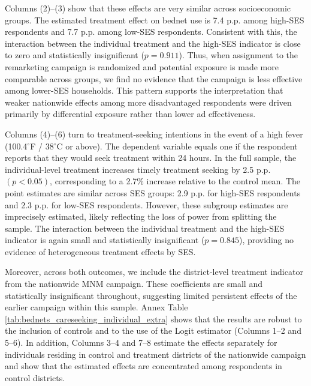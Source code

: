 \begin{table}[h!]
    \centering
    \caption{Sleeping under bednet and timely treatment seeking (individual-level study)}
    \footnotesize
    \hspace*{-0.3cm}
    
    \label{tab:bednets_careseeking_individual}
\end{table}



Columns (2)--(3) show that these effects are very similar across socioeconomic groups. The estimated treatment effect on bednet use is 7.4 p.p. among high-SES respondents and 7.7 p.p. among low-SES respondents. Consistent with this, the interaction between the individual treatment and the high-SES indicator is close to zero and statistically insignificant ($p = 0.911$). Thus, when assignment to the remarketing campaign is randomized and potential exposure is made more comparable across groups, we find no evidence that the campaign is less effective among lower-SES households. This pattern supports the interpretation that weaker nationwide effects among more disadvantaged respondents were driven primarily by differential exposure rather than lower ad effectiveness.

Columns (4)--(6) turn to treatment-seeking intentions in the event of a high fever (100.4$^\circ$F / 38$^\circ$C or above). The dependent variable equals one if the respondent reports that they would seek treatment within 24 hours. In the full sample, the individual-level treatment increases timely treatment seeking by 2.5 p.p. $(p<0.05)$, corresponding to a 2.7\% increase relative to the control mean. The point estimates are similar across SES groups: 2.9 p.p. for high-SES respondents and 2.3 p.p. for low-SES respondents. However, these subgroup estimates are imprecisely estimated, likely reflecting the loss of power from splitting the sample. The interaction between the individual treatment and the high-SES indicator is again small and statistically insignificant ($p = 0.845$), providing no evidence of heterogeneous treatment effects by SES.

Moreover, across both outcomes, we include the district-level treatment indicator from the nationwide MNM campaign. These coefficients are small and statistically insignificant throughout, suggesting limited persistent effects of the earlier campaign within this sample. Annex Table \ref{tab:bednets_careseeking_individual_extra} shows that the results are robust to the inclusion of controls and to the use of the Logit estimator (Columns 1--2 and 5--6). In addition, Columns 3--4 and 7--8 estimate the effects separately for individuals residing in control and treatment districts of the nationwide campaign and show that the estimated effects are concentrated among respondents in control districts. %

